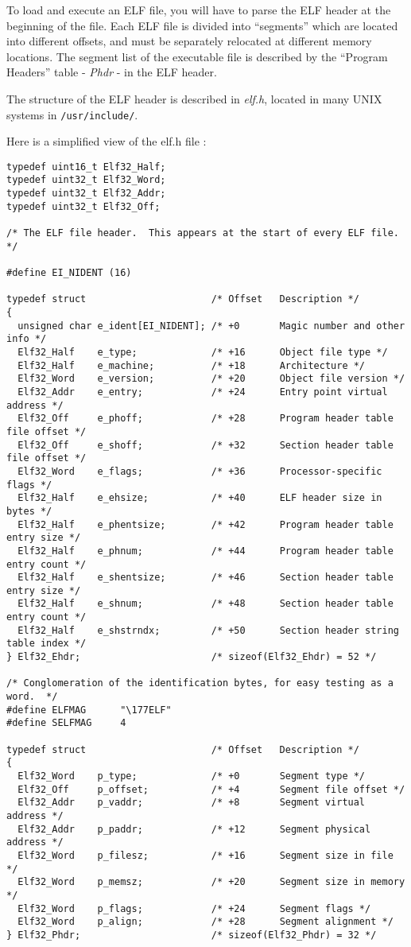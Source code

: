 To load and execute an ELF file, you will have to parse the ELF header at the
beginning of the file. Each ELF file is divided into ``segments'' which are
located into different offsets, and must be separately relocated at different
memory locations. The segment list of the executable file is described by the
``Program Headers'' table - \emph{Phdr} - in the ELF header.

The structure of the ELF header is described in \emph{elf.h}, located in many
UNIX systems in \verb+/usr/include/+.

Here is a simplified view of the elf.h file :

\begin{verbatim}
typedef uint16_t Elf32_Half;
typedef uint32_t Elf32_Word;
typedef uint32_t Elf32_Addr;
typedef uint32_t Elf32_Off;

/* The ELF file header.  This appears at the start of every ELF file.  */

#define EI_NIDENT (16)

typedef struct                      /* Offset   Description */
{
  unsigned char e_ident[EI_NIDENT]; /* +0       Magic number and other info */
  Elf32_Half    e_type;             /* +16      Object file type */
  Elf32_Half    e_machine;          /* +18      Architecture */
  Elf32_Word    e_version;          /* +20      Object file version */
  Elf32_Addr    e_entry;            /* +24      Entry point virtual address */
  Elf32_Off     e_phoff;            /* +28      Program header table file offset */
  Elf32_Off     e_shoff;            /* +32      Section header table file offset */
  Elf32_Word    e_flags;            /* +36      Processor-specific flags */
  Elf32_Half    e_ehsize;           /* +40      ELF header size in bytes */
  Elf32_Half    e_phentsize;        /* +42      Program header table entry size */
  Elf32_Half    e_phnum;            /* +44      Program header table entry count */
  Elf32_Half    e_shentsize;        /* +46      Section header table entry size */
  Elf32_Half    e_shnum;            /* +48      Section header table entry count */
  Elf32_Half    e_shstrndx;         /* +50      Section header string table index */
} Elf32_Ehdr;                       /* sizeof(Elf32_Ehdr) = 52 */

/* Conglomeration of the identification bytes, for easy testing as a word.  */
#define	ELFMAG		"\177ELF"
#define	SELFMAG		4

typedef struct                      /* Offset   Description */
{
  Elf32_Word    p_type;             /* +0       Segment type */
  Elf32_Off     p_offset;           /* +4       Segment file offset */
  Elf32_Addr    p_vaddr;            /* +8       Segment virtual address */
  Elf32_Addr    p_paddr;            /* +12      Segment physical address */
  Elf32_Word    p_filesz;           /* +16      Segment size in file */
  Elf32_Word    p_memsz;            /* +20      Segment size in memory */
  Elf32_Word    p_flags;            /* +24      Segment flags */
  Elf32_Word    p_align;            /* +28      Segment alignment */
} Elf32_Phdr;                       /* sizeof(Elf32_Phdr) = 32 */
\end{verbatim}

